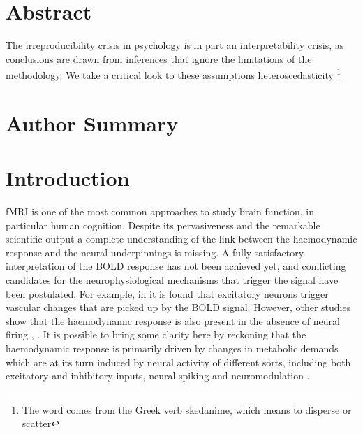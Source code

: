 \documentclass[10pt,letterpaper]{article}
\begin{document}
\section*{Abstract}

The irreproducibility crisis in psychology is in part an interpretability crisis, as conclusions are drawn from inferences that ignore the limitations of the  methodology. We take a critical look to these assumptions
heteroscedasticity \footnote{The word comes from the Greek verb skedanime, which means to disperse or scatter}
\section*{Author Summary}


\linenumbers


\section*{Introduction}
\label{se:intro}
fMRI is one of the most common approaches to study brain function, in particular human cognition. Despite its pervasiveness and the remarkable scientific output a complete understanding of the link between the haemodynamic response and the neural underpinnings is missing.
A fully satisfactory interpretation of the BOLD response has not been achieved yet, and conflicting candidates for the neurophysiological mechanisms that trigger the signal have been postulated. For example, in \cite{lee2010global} it is found that excitatory neurons trigger vascular changes that are picked up by the BOLD signal. However, other studies show that the haemodynamic response is also present in the absence of neural firing \citep{goense2008neurophysiology}, \citep{sirotin2009anticipatory}. 
It is possible to bring some clarity here by reckoning that the haemodynamic response is primarily driven by changes in metabolic demands which are at its turn induced by neural activity of different sorts, including both excitatory and inhibitory inputs, neural spiking and neuromodulation \citep{logothetis2008we}.  
\end{document}

